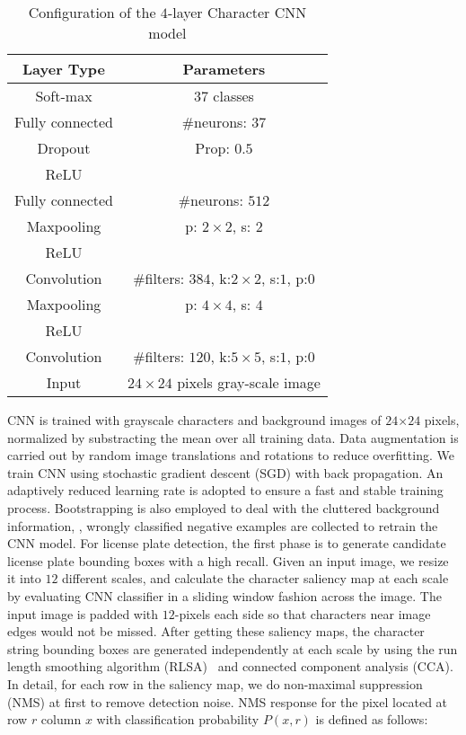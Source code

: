 \documentclass[twocolumn]{svjour3}
\begin{document}
\begin{table}[ht]
	\begin{center}
	\caption{Configuration of the $4$-layer Character CNN model}
	\label{Tab:1}{
	\begin{tabular}{c|c}
	\hline
	 Layer Type & Parameters  \\
	\hline
	Soft-max & $37$ classes \\
	\hline
	Fully connected & \#neurons: $37$ \\
	\hline
	Dropout & Prop: $0.5$ \\
	\hline
	ReLU & \\
	\hline
	Fully connected & \#neurons: $512$ \\
 	\hline
 	Maxpooling & p: $2 \times 2$, s: $2$ \\
   \hline
    ReLU & \\
 	\hline
 	Convolution & \#filters: $384$, k:$2 \times 2$, s:$1$, p:$0$ \\
	\hline
	Maxpooling & p: $4 \times 4$, s: $4$ \\
	\hline
	ReLU & \\
	\hline
	Convolution & \#filters: $120$, k:$5 \times 5$, s:$1$, p:$0$ \\
	\hline
	Input & $24 \times 24$ pixels gray-scale image \\
	\hline
	\end{tabular}
	}

	\end{center}
\end{table}

CNN is trained with grayscale characters and background images of $24$$\times$$24$ pixels, normalized by substracting the mean over all training data. Data augmentation is carried out by random image translations and rotations to reduce overfitting. We train CNN using stochastic gradient descent (SGD)
with back propagation. An adaptively reduced learning rate is adopted to ensure a fast and stable training process. %
Bootstrapping is also employed to deal with the cluttered background information, \ie, wrongly classified negative examples are
collected to retrain the CNN model. %
For license plate detection, the first phase is to generate candidate license plate bounding boxes with a high recall. Given an input image, we resize it into $12$ different scales, and calculate the character saliency map at each scale by evaluating CNN classifier in a sliding window fashion across the image.  The input image is padded with $12$-pixels each side so that characters near image edges would not be missed. After getting these saliency maps, the character string bounding boxes are generated independently at each scale by using the run length smoothing algorithm (RLSA)~\cite{Max2014ECCV} and connected component analysis (CCA). In detail, for each row in the saliency map, we do non-maximal suppression (NMS) at first to remove detection noise. NMS response for the pixel located at row $r$ column $x$ with classification probability $P(x,r)$ is defined as follows:
\end{document}

